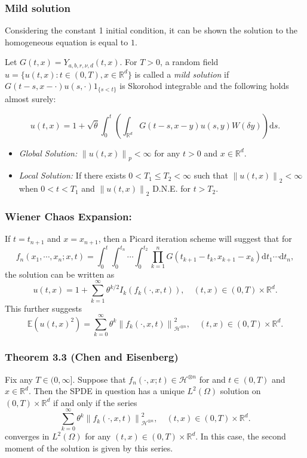 \documentclass{beamer}
\numberwithin{equation}{section}
\newcommand{\R}{\mathbb{R}}
\newcommand{\Norm}[1]{\left\|  #1   \right\|}
\newcommand{\ud}{\ensuremath{\mathrm{d}}}
\begin{document}
	\begin{frame}[t]
		\frametitle{Mild solution}
		Considering the constant 1 initial condition, it can be shown the solution to the homogeneous equation is equal to $1$. 
		\begin{definition}
			Let $G(t,x) = Y_{a,b,r,\nu,d}(t,x)$. For $T > 0$, a random field $u=\{u(t,x): t \in (0,T), x \in \R^d \} $ is called a \textit{mild solution} if $G(t-s,x-\cdot)u(s,\cdot)1_{\{s<t\}}$ is Skorohod integrable and the following holds almost surely:
		\end{definition}
		\[
		u(t,x) = 1 + \sqrt{\theta} \int_0^t \left(\int_{\R^d} G(t-s,x-y)u(s,y)W(\delta y)\right) \ud s.
		\]
		
		\begin{itemize}
			\item \textit{Global Solution:} $\Norm{u(t,x)}_p < \infty$ for any $t>0$ and $x \in \R^d$.
			\item \textit{Local Solution:} If there exists $0 < T_1 \le T_2 < \infty$ such that $\Norm{u(t,x)}_2 < \infty$ when $0<t<T_1$ and $\Norm{u(t,x)}_2 $ D.N.E. for $t> T_2$.
		\end{itemize}
	\end{frame}
	
	
	\begin{frame}[t]
		\frametitle{Wiener Chaos Expansion:}
		If $t=t_{n+1}$ and $x=x_{n+1}$, then a Picard iteration scheme will suggest that for  
		\[
		f_n(x_1, \cdots , x_n; x, t) = \int_0^t\int_0^{t_n}\cdots \int_0^{t_2} \prod_{k=1}^n G(t_{k+1}-t_k,x_{k+1}-x_k) \ud t_1 \cdots \ud t_n,
		\]
		the solution can be written as 
		\begin{equation}\label{E:WC}
		u(t,x) = 1 + \sum_{k=1}^\infty \theta^{k/2} I_k(f_k(\cdot,x,t)), \quad (t,x)\in (0,T)\times \R^d.
		\end{equation}
		This further suggests 
		\begin{equation}\label{E:2Mom}
		\mathbb{E}(u(t,x)^2) = \sum_{k=0}^\infty \theta^{k} \Norm{f_k(\cdot,x,t)}^2_{\mathcal{H}^{\otimes n}}, \quad (t,x)\in (0,T)\times \R^d.
		\end{equation}
	\end{frame}
	
	\begin{frame}[t]
		\frametitle{Theorem 3.3 (Chen and Eisenberg)}
		
		\begin{theorem}
			Fix any $T \in (0,\infty]$. Suppose that $f_n(\cdot,x;t) \in \mathcal{H}^{\otimes n}$ for and $t \in (0,T)$ and $x\in \R^d$. Then the SPDE in question has a unique $L^2(\Omega)$ solution on $(0,T) \times \R^d$ if and only if the series 	
			\[
			\sum_{k=0}^\infty \theta^{k} \Norm{f_k(\cdot,x,t)}^2_{\mathcal{H}^{\otimes n}}, \quad (t,x)\in (0,T)\times \R^d.
			\]
			converges in $L^2(\Omega)$ for any $(t,x) \in (0,T) \times \R^d$. In this case, the second moment of the solution is given by this series. 
		\end{theorem} 
	\end{frame}
	
\end{document}
